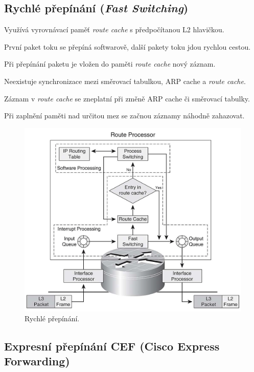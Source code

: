 \subsection{Rychlé přepínání (\textit{Fast Switching})}

\begin{compactitem}
    \item Využívá vyrovnávací paměť \textit{route cache} s předpočítanou L2 hlavičkou.
    \item První paket toku se přepíná softwarově, další pakety toku jdou rychlou cestou.
    \item Při přepínání paketu je vložen do paměti \textit{route cache} nový záznam.
    \item Neexistuje synchronizace mezi směrovací tabulkou, ARP cache a \textit{route cache}.
    \item Záznam v \textit{route cache} se zneplatní při změně ARP cache či směrovací tabulky.
    \item Při zaplnění paměti nad určitou mez se začnou záznamy náhodně zahazovat.
\end{compactitem}

\begin{figure}[H]
    \centering
    \includegraphics[width=1\linewidth]{rychle_prepinani.png}
    \caption{Rychlé přepínání.}
\end{figure}

\subsection{Expresní přepínání CEF (Cisco Express Forwarding)}

